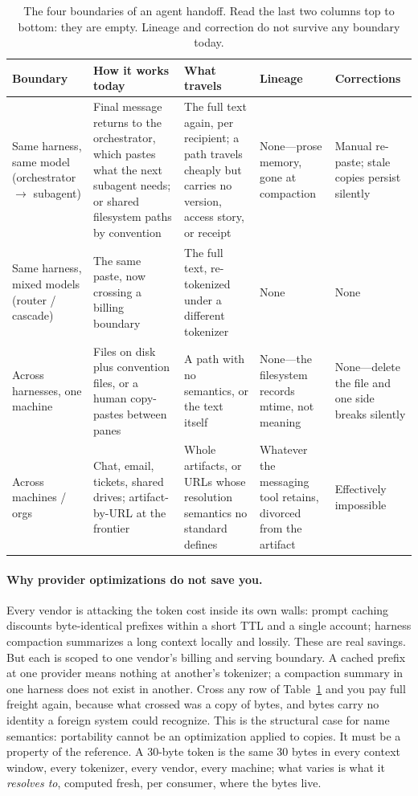\documentclass[10pt,twocolumn]{article}
\begin{document}
\begin{table}[t]
\centering
\small
\caption{The four boundaries of an agent handoff. Read the last two
columns top to bottom: they are empty. Lineage and correction do not
survive any boundary today.}
\label{tab:boundaries}
\renewcommand{\arraystretch}{1.25}
\begin{tabular}{@{}p{2.9cm}p{4.1cm}p{4.1cm}p{2.4cm}p{2.0cm}@{}}
\toprule
\textbf{Boundary} & \textbf{How it works today} & \textbf{What travels} &
\textbf{Lineage} & \textbf{Corrections}\\
\midrule
Same harness, same model (orchestrator $\to$ subagent) &
Final message returns to the orchestrator, which pastes what the next
subagent needs; or shared filesystem paths by convention &
The full text again, per recipient; a path travels cheaply but carries no
version, access story, or receipt &
None---prose memory, gone at compaction &
Manual re-paste; stale copies persist silently\\
Same harness, mixed models (router / cascade) &
The same paste, now crossing a billing boundary &
The full text, re-tokenized under a different tokenizer &
None &
None\\
Across harnesses, one machine &
Files on disk plus convention files, or a human copy-pastes between panes &
A path with no semantics, or the text itself &
None---the filesystem records mtime, not meaning &
None---delete the file and one side breaks silently\\
Across machines / orgs &
Chat, email, tickets, shared drives; artifact-by-URL at the frontier &
Whole artifacts, or URLs whose resolution semantics no standard defines &
Whatever the messaging tool retains, divorced from the artifact &
Effectively impossible\\
\bottomrule
\end{tabular}
\end{table}

\paragraph{Why provider optimizations do not save you.} Every vendor is
attacking the token cost inside its own walls: prompt caching discounts
byte-identical prefixes within a short TTL and a single account; harness
compaction summarizes a long context locally and lossily. These are real
savings. But each is scoped to one vendor's billing and serving boundary.
A cached prefix at one provider means nothing at another's tokenizer; a
compaction summary in one harness does not exist in another. Cross any row
of Table~\ref{tab:boundaries} and you pay full freight again, because what
crossed was a copy of bytes, and bytes carry no identity a foreign system
could recognize. This is the structural case for name semantics:
portability cannot be an optimization applied to copies. It must be a
property of the reference. A 30-byte token is the same 30 bytes in every
context window, every tokenizer, every vendor, every machine; what varies
is what it \emph{resolves to}, computed fresh, per consumer, where the
bytes live.
\end{document}

